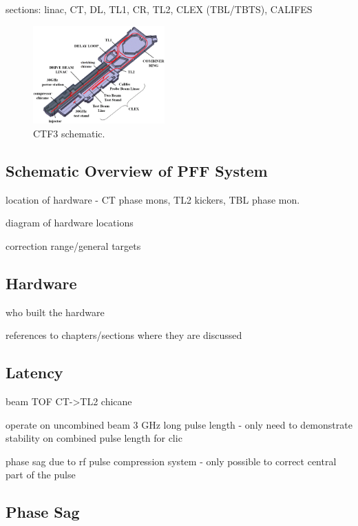 sections: linac, CT, DL, TL1, CR, TL2, CLEX (TBL/TBTS), CALIFES

\begin{figure}
  \centering
  \includegraphics[width=0.45\textwidth]{Figures/ctfLayout}
  \caption{CTF3 schematic.}
  \label{f:ctfLayout}
\end{figure}


\subsection{Schematic Overview of PFF System}
\label{ss:ctfPFFLayout}

location of hardware - CT phase mons, TL2 kickers, TBL phase mon.

diagram of hardware locations

correction range/general targets

\subsection{Hardware}
\label{ss:ctfPFFHardware}

who built the hardware

references to chapters/sections where they are discussed

\subsection{Latency}
\label{ss:availLatency}

beam TOF CT->TL2 chicane


operate on uncombined beam
3 GHz
long pulse length - only need to demonstrate stability on combined pulse length for clic

phase sag due to rf pulse compression system - only possible to correct central part of the pulse

\subsection{Phase Sag}
\label{ss:phaseSag}

